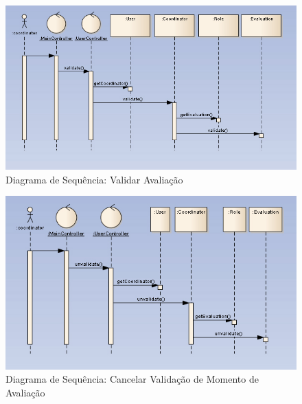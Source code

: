 \begin{figure}[!htbp]
\centering
\includegraphics[width=17cm]{imagens/validar_momento_de_avaliacao.jpg}
\caption{Diagrama de Sequência: Validar Avaliação}
\label{fig:validar_avaliacao}
\end{figure}

\begin{figure}[!htbp]
\centering
\includegraphics[width=17cm]{imagens/cancelar_validacao.jpg}
\caption{Diagrama de Sequência: Cancelar Validação de Momento de Avaliação}
\label{fig:cancelar_validacao}
\end{figure}